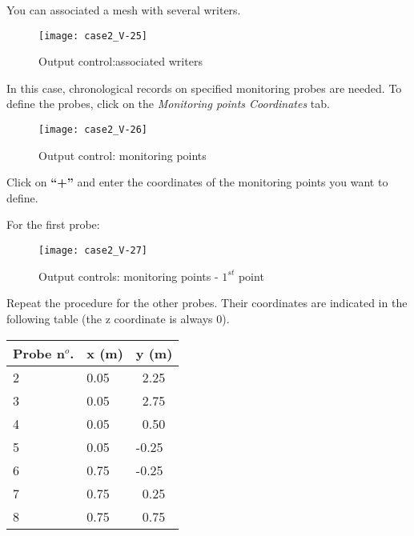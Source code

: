 \newpage
You can associated a mesh with several writers.
\begin{figure}[h!]
\begin{center}
\texttt{[image: case2\_V-25]}
\caption{Output control:associated writers}
\label{fig24_e2}
\end{center}
\end{figure}

\newpage
In this case, chronological records on specified monitoring probes are needed.
To define the probes, click on the
{\itshape Monitoring points Coordinates} tab.

\begin{figure}[h!]
\begin{center}
\texttt{[image: case2\_V-26]}
\caption{Output control: monitoring points}
\label{fig25_e2}
\end{center}
\end{figure}



\newpage
Click on {\bf ``+''} and enter the coordinates of the monitoring points you want to define.

For the first probe:\\


\begin{figure}[h!]
\begin{center}
\texttt{[image: case2\_V-27]}
\caption{Output controls: monitoring points - $1^{st}$ point}
\label{fig27_e2}
\end{center}
\end{figure}


\newpage
Repeat the procedure for the other probes. Their coordinates are indicated in
the following table (the z coordinate is always 0).
\begin{center}
\begin{tabular}{|l|l|l|}
\hline
Probe n$^o$. & x (m) & y (m) \\
\hline
\hline
2 & 0.05 & ~2.25 \\
\hline
3 & 0.05 & ~2.75 \\
\hline
4 & 0.05 & ~0.50 \\
\hline
5 & 0.05 & -0.25 \\
\hline
6 & 0.75 & -0.25 \\
\hline
7 & 0.75 & ~0.25 \\
\hline
8 & 0.75 & ~0.75 \\
\hline
\end{tabular}
\end{center}

